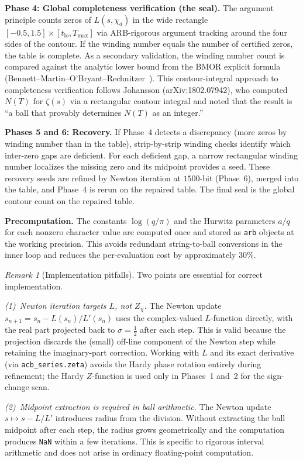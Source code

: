 \documentclass[12pt,reqno]{amsart}
\theoremstyle{plain}
\theoremstyle{definition}
\theoremstyle{remark}
\newtheorem{remark}[theorem]{Remark}
\begin{document}
\medskip\noindent\textbf{Phase 4: Global completeness verification (the seal).}  The argument principle counts zeros of $L(s, \chi_d)$ in the wide rectangle $[-0.5, 1.5] \times [t_{\mathrm{lo}}, T_{\max}]$ via ARB-rigorous argument tracking around the four sides of the contour.  If the winding number equals the number of certified zeros, the table is complete.  As a secondary validation, the winding number count is compared against the analytic lower bound from the BMOR explicit formula (Bennett--Martin--O'Bryant--Rechnitzer~\cite{BMOR2021}).  This contour-integral approach to completeness verification follows Johansson (arXiv:1802.07942), who computed $N(T)$ for $\zeta(s)$ via a rectangular contour integral and noted that the result is ``a ball that provably determines $N(T)$ as an integer.''

\medskip\noindent\textbf{Phases 5 and 6: Recovery.}  If Phase~4 detects a discrepancy (more zeros by winding number than in the table), strip-by-strip winding checks identify which inter-zero gaps are deficient.  For each deficient gap, a narrow rectangular winding number localizes the missing zero and its midpoint provides a seed.  These recovery seeds are refined by Newton iteration at $1500$-bit (Phase~6), merged into the table, and Phase~4 is rerun on the repaired table.  The final seal is the global contour count on the repaired table.

\medskip\noindent\textbf{Precomputation.}  The constants $\log(q/\pi)$ and the Hurwitz parameters $a/q$ for each nonzero character value are computed once and stored as \texttt{arb} objects at the working precision.  This avoids redundant string-to-ball conversions in the inner loop and reduces the per-evaluation cost by approximately $30\%$.

\begin{remark}[Implementation pitfalls]\label{rem:pitfalls}
Two points are essential for correct implementation.

\emph{(1)~Newton iteration targets $L$, not $Z_\chi$.}  The Newton update $s_{n+1} = s_n - L(s_n)/L'(s_n)$ uses the complex-valued $L$-function directly, with the real part projected back to $\sigma = \tfrac{1}{2}$ after each step.  This is valid because the projection discards the (small) off-line component of the Newton step while retaining the imaginary-part correction.  Working with $L$ and its exact derivative (via \texttt{acb\_series.zeta}) avoids the Hardy phase rotation entirely during refinement; the Hardy $Z$-function is used only in Phases~1 and~2 for the sign-change scan.

\emph{(2)~Midpoint extraction is required in ball arithmetic.}  The Newton update $s \mapsto s - L/L'$ introduces radius from the division.  Without extracting the ball midpoint after each step, the radius grows geometrically and the computation produces \texttt{NaN} within a few iterations.  This is specific to rigorous interval arithmetic and does not arise in ordinary floating-point computation.
\end{remark}
\end{document}

